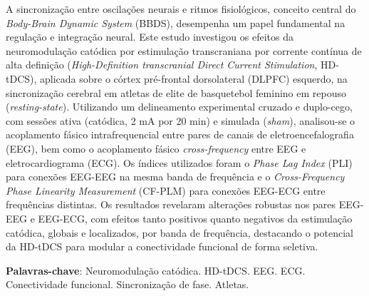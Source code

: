 
\setlength{\absparsep}{18pt} %
\begin{resumo}
A sincronização entre oscilações neurais e ritmos fisiológicos, conceito central do \textit{Body-Brain Dynamic System} (BBDS), desempenha um papel fundamental na regulação e integração neural. Este estudo investigou os efeitos da neuromodulação catódica por estimulação transcraniana por corrente contínua de alta definição (\textit{High-Definition transcranial Direct Current Stimulation}, HD-tDCS), aplicada sobre o córtex pré-frontal dorsolateral (DLPFC) esquerdo, na sincronização cerebral em atletas de elite de basquetebol feminino em repouso (\textit{resting-state}). Utilizando um delineamento experimental cruzado e duplo-cego, com sessões ativa (catódica, 2 mA por 20 min) e simulada (\textit{sham}), analisou-se o acoplamento fásico intrafrequencial entre pares de canais de eletroencefalografia (EEG), bem como o acoplamento fásico \textit{cross-frequency} entre EEG e eletrocardiograma (ECG). Os índices utilizados foram o \textit{Phase Lag Index} (PLI) para conexões EEG-EEG na mesma banda de frequência e o \textit{Cross-Frequency Phase Linearity Measurement} (CF-PLM) para conexões EEG-ECG entre frequências distintas. Os resultados revelaram alterações robustas nos pares EEG-EEG e EEG-ECG, com efeitos tanto positivos quanto negativos da estimulação catódica, globais e localizados, por banda de frequência, destacando o potencial da HD-tDCS para modular a conectividade funcional de forma seletiva.

\vspace{\onelineskip}

\textbf{Palavras-chave}: Neuromodulação catódica. HD-tDCS. EEG. ECG. Conectividade funcional. Sincronização de fase. Atletas.
\end{resumo}

